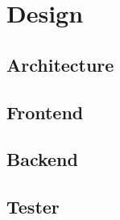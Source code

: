 \chapter{Design}

\section{Architecture}


\section{Frontend}


\section{Backend}


\section{Tester}

